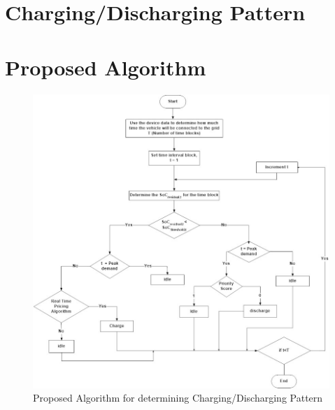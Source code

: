 	\section{Charging/Discharging Pattern}
	
	\section{Proposed Algorithm}
		\begin{figure}
			\centering
			\includegraphics[width=1\linewidth]{Ev_flowchart}
			\caption{Proposed Algorithm for determining Charging/Discharging Pattern}
			\label{fig:evflowchart}
		\end{figure}
		
	
	